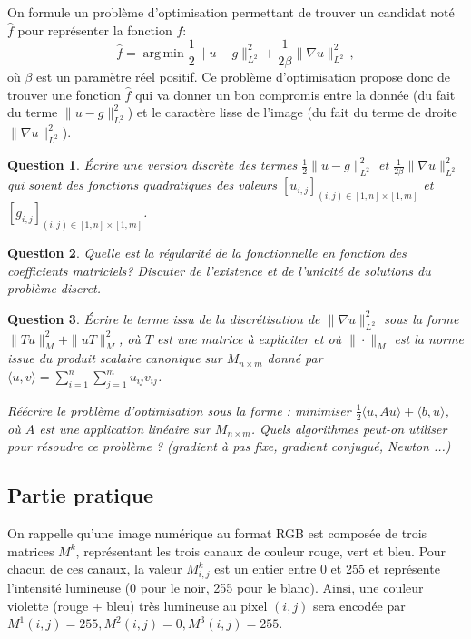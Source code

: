 \documentclass[10pt,a4paper,fleqn]{report}
\DeclareMathOperator*{\argmin}{arg\,min}
\newtheorem{question}{Question}
\begin{document}
On formule un probl\`eme d'optimisation permettant de trouver un
candidat not\'e $\hat{f}$ pour repr\'esenter la fonction $f$:
\begin{equation}
\hat{f} = \argmin \frac12 \| u -  g\|_{L^2}^2 + \frac{1}{2\beta}\| \nabla u \|^2_{L^2}\,,
\end{equation}
o\`u $\beta$ est un param\`etre r\'eel positif.  Ce probl\`eme
d'optimisation propose donc de trouver une fonction $\hat{f}$ qui va
donner un bon compromis entre la donn\'ee (du fait du terme $ \| u -
g\|_{L^2}^2 $) et le caractère lisse de l'image (du fait du terme de
droite $\| \nabla u \|^2_{L^2}$).

\begin{question}
\'Ecrire une version discr\`ete des termes $\frac12 \| u -  g\|_{L^2}^2$ et $\frac{1}{2\beta}\| \nabla u \|^2_{L^2}$ qui soient des fonctions quadratiques des valeurs $[u_{i,j}]_{(i,j)\in [1,n]\times[1,m]}$ et $[g_{i,j}]_{(i,j)\in [1,n]\times[1,m]}$.
\end{question}

\begin{question}
Quelle est la r\'egularit\'e de la fonctionnelle en fonction des coefficients matriciels?
Discuter de l'existence et de l'unicit\'e de solutions du probl\`eme discret.
\end{question}

\begin{question}
  Écrire le terme issu de la discrétisation de $\| \nabla u
  \|^2_{L^2}$ sous la forme $\|Tu\|^{2}_{M} + \|u T\|^{2}_{M}$, où
  $T$ est une matrice à expliciter et où $\|\cdot\|_{M}$ est la norme
  issue du produit scalaire canonique sur $M_{n \times m}$ donné par
  $\langle u,v \rangle = \sum_{i=1}^{n}\sum_{j=1}^{m} u_{ij} v_{ij}$.

  Réécrire le problème d'optimisation sous la forme : minimiser $\frac
  1 2 \langle u, Au\rangle + \langle b, u\rangle$, où $A$ est une
  application linéaire sur $M_{n\times m}$. Quels algorithmes peut-on
  utiliser pour résoudre ce problème ? (gradient à pas fixe, gradient
  conjugué, Newton ...)
\end{question}

\subsection{Partie pratique}

On rappelle qu'une image numérique au format RGB est composée de trois
matrices $M^{k}$, représentant les trois canaux de couleur rouge, vert
et bleu. Pour chacun de ces canaux, la valeur $M^{k}_{i,j}$ est un
entier entre 0 et 255 et représente l'intensité lumineuse (0 pour le
noir, 255 pour le blanc). Ainsi, une couleur violette (rouge + bleu)
très lumineuse au pixel $(i,j)$ sera encodée par $M^{1}(i,j) = 255,
M^{2}(i,j) = 0, M^{3}(i,j) = 255$.
\end{document}
